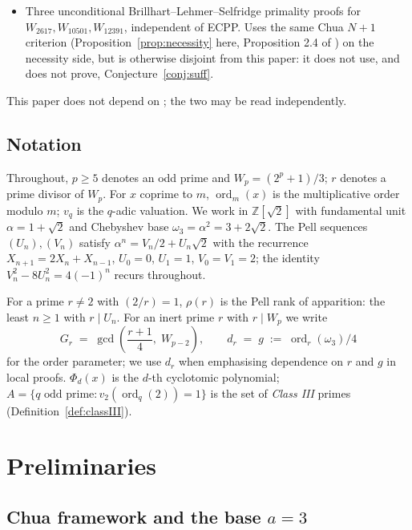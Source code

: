 \documentclass[11pt]{amsart}
\theoremstyle{plain}
\theoremstyle{definition}
\theoremstyle{remark}
\numberwithin{equation}{section}
\newcommand{\ord}{\operatorname{ord}}
\newcommand{\Z}{\mathbb{Z}}
\begin{document}
\begin{itemize}
\item \textbf{\cite{ref:A}} Three unconditional Brillhart--Lehmer--Selfridge \cite{ref:BLS} primality proofs for $W_{2617}, W_{10501}, W_{12391}$, independent of ECPP. Uses the same Chua $N + 1$ criterion (Proposition~\ref{prop:necessity} here, Proposition 2.4 of \cite{ref:A}) on the necessity side, but is otherwise disjoint from this paper: it does not use, and does not prove, Conjecture~\ref{conj:suff}.
\end{itemize}

This paper does not depend on \cite{ref:A}; the two may be read independently.

\subsection{Notation}\label{sec:notation}

Throughout, $p \geq 5$ denotes an odd prime and $W_p = (2^p + 1)/3$; $r$ denotes a prime divisor of $W_p$. For $x$ coprime to $m$, $\ord_m(x)$ is the multiplicative order modulo $m$; $v_q$ is the $q$-adic valuation. We work in $\Z[\sqrt 2]$ with fundamental unit $\alpha = 1 + \sqrt 2$ and Chebyshev base $\omega_3 = \alpha^2 = 3 + 2\sqrt 2$. The Pell sequences $(U_n), (V_n)$ satisfy $\alpha^n = V_n/2 + U_n \sqrt 2$ with the recurrence $X_{n+1} = 2 X_n + X_{n-1}$, $U_0 = 0$, $U_1 = 1$, $V_0 = V_1 = 2$; the identity $V_n^2 - 8 U_n^2 = 4(-1)^n$ recurs throughout.

For a prime $r \neq 2$ with $(2/r) = 1$, $\rho(r)$ is the Pell rank of apparition: the least $n \geq 1$ with $r \mid U_n$. For an inert prime $r$ with $r \mid W_p$ we write
\[
  G_r \;=\; \gcd\!\left(\frac{r+1}{4},\; W_{p-2}\right), \qquad d_r \;=\; g \;:=\; \ord_r(\omega_3)/4
\]
for the order parameter; we use $d_r$ when emphasising dependence on $r$ and $g$ in local proofs. $\Phi_d(x)$ is the $d$-th cyclotomic polynomial; $A = \{q \text{ odd prime} : v_2(\ord_q(2)) = 1\}$ is the set of \emph{Class III} primes (Definition~\ref{def:classIII}).

\section{Preliminaries}

\subsection{Chua framework and the base \texorpdfstring{$a = 3$}{a = 3}}
\end{document}
